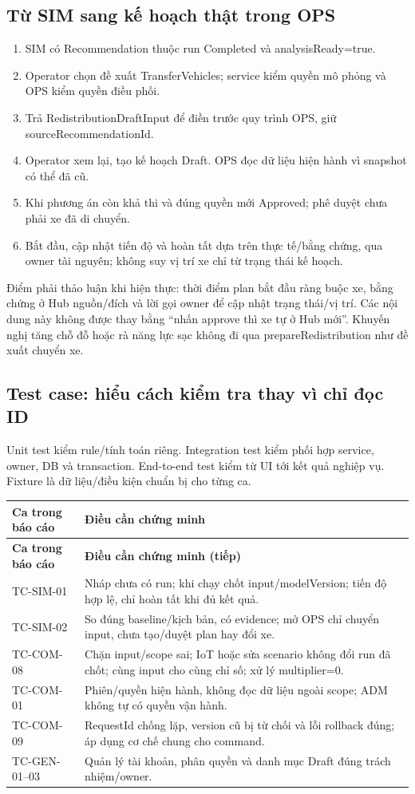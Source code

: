 \documentclass[12pt,a4paper]{article}
\newenvironment{PairTable}[2]{%
  \begin{longtable}{|L{39mm}|L{106mm}|}\hline
  \textbf{#1} & \textbf{#2}\\\hline\endfirsthead
  \hline\textbf{#1} & \textbf{#2 (tiếp)}\\\hline\endhead
}{\end{longtable}}
\begin{document}
\subsection{Từ SIM sang kế hoạch thật trong OPS}
\begin{enumerate}
\item SIM có Recommendation thuộc run Completed và analysisReady=true.
\item Operator chọn đề xuất TransferVehicles; service kiểm quyền mô phỏng và OPS kiểm quyền điều phối.
\item Trả RedistributionDraftInput để điền trước quy trình OPS, giữ sourceRecommendationId.
\item Operator xem lại, tạo kế hoạch Draft. OPS đọc dữ liệu hiện hành vì snapshot có thể đã cũ.
\item Khi phương án còn khả thi và đúng quyền mới Approved; phê duyệt chưa phải xe đã di chuyển.
\item Bắt đầu, cập nhật tiến độ và hoàn tất dựa trên thực tế/bằng chứng, qua owner tài nguyên; không suy vị trí xe chỉ từ trạng thái kế hoạch.
\end{enumerate}

Điểm phải thảo luận khi hiện thực: thời điểm plan bắt đầu ràng buộc xe, bằng chứng ở Hub nguồn/đích và lời gọi owner để cập nhật trạng thái/vị trí. Các nội dung này không được thay bằng ``nhấn approve thì xe tự ở Hub mới''. Khuyến nghị tăng chỗ đỗ hoặc rà năng lực sạc không đi qua prepareRedistribution như đề xuất chuyển xe.

\subsection{Test case: hiểu cách kiểm tra thay vì chỉ đọc ID}
Unit test kiểm rule/tính toán riêng. Integration test kiểm phối hợp service, owner, DB và transaction. End-to-end test kiểm từ UI tới kết quả nghiệp vụ. Fixture là dữ liệu/điều kiện chuẩn bị cho từng ca.

\begin{PairTable}{Ca trong báo cáo}{Điều cần chứng minh}
TC-SIM-01 & Nháp chưa có run; khi chạy chốt input/modelVersion; tiến độ hợp lệ, chỉ hoàn tất khi đủ kết quả.\\\hline
TC-SIM-02 & So đúng baseline/kịch bản, có evidence; mở OPS chỉ chuyển input, chưa tạo/duyệt plan hay đổi xe.\\\hline
TC-COM-08 & Chặn input/scope sai; IoT hoặc sửa scenario không đổi run đã chốt; cùng input cho cùng chỉ số; xử lý multiplier=0.\\\hline
TC-COM-01 & Phiên/quyền hiện hành, không đọc dữ liệu ngoài scope; ADM không tự có quyền vận hành.\\\hline
TC-COM-09 & RequestId chống lặp, version cũ bị từ chối và lỗi rollback đúng; áp dụng cơ chế chung cho command.\\\hline
TC-GEN-01--03 & Quản lý tài khoản, phân quyền và danh mục Draft đúng trách nhiệm/owner.\\\hline
\end{PairTable}
\end{document}
